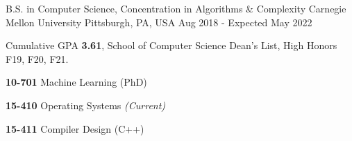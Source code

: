 

\begin{cventries}

  \eduentry
    {B.S. in Computer Science, Concentration in Algorithms \& Complexity} %
    {Carnegie Mellon University} %
    {Pittsburgh, PA, USA} %
    {Aug 2018 - Expected May 2022} %
    {
      \begin{cvitems} %
      \item {Cumulative GPA \textbf{3.61}, School of Computer Science Dean's List, High Honors F19, F20, F21. }
      \item {}
        \setlength\multicolsep{0pt}
        \begin{multicols}{3}
          \item[] {\textbf{10-701} Machine Learning (PhD)}
          \item[] {\textbf{15-410} Operating Systems
			  \textit{\color{awesome}(Current)}}
          \item[] {\textbf{15-411} Compiler Design (C++)}

\end{multicols}
\end{cvitems}}
\end{cventries}
